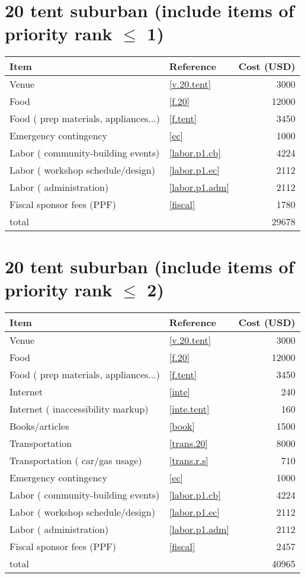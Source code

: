 \section*{20 tent suburban (include items of priority rank $\leq$ 1)}
\begin{center}
\begin{tabular}{llr}
Item & Reference & Cost (USD) \\ \hline
Venue & \ref{v.20.tent} & 3000 \\
Food & \ref{f.20} & 12000 \\
Food ( prep materials, appliances...) & \ref{f.tent} & 3450 \\
Emergency contingency & \ref{ec} & 1000 \\
Labor ( community-building events) & \ref{labor.p1.cb} & 4224 \\
Labor ( workshop schedule/design) & \ref{labor.p1.ec} & 2112 \\
Labor ( administration) & \ref{labor.p1.adm} & 2112 \\
Fiscal sponsor fees (PPF) & \ref{fiscal} & 1780 \\ \hline
total &  & 29678
\end{tabular}
\end{center}
\newpage
\section*{20 tent suburban (include items of priority rank $\leq$ 2)}
\begin{center}
\begin{tabular}{llr}
Item & Reference & Cost (USD) \\ \hline
Venue & \ref{v.20.tent} & 3000 \\
Food & \ref{f.20} & 12000 \\
Food ( prep materials, appliances...) & \ref{f.tent} & 3450 \\
Internet & \ref{inte} & 240 \\
Internet ( inaccessibility markup) & \ref{inte.tent} & 160 \\
Books/articles & \ref{book} & 1500 \\
Transportation & \ref{trans.20} & 8000 \\
Transportation ( car/gas usage) & \ref{trans.r.s} & 710 \\
Emergency contingency & \ref{ec} & 1000 \\
Labor ( community-building events) & \ref{labor.p1.cb} & 4224 \\
Labor ( workshop schedule/design) & \ref{labor.p1.ec} & 2112 \\
Labor ( administration) & \ref{labor.p1.adm} & 2112 \\
Fiscal sponsor fees (PPF) & \ref{fiscal} & 2457 \\ \hline
total &  & 40965
\end{tabular}
\end{center}
\newpage

